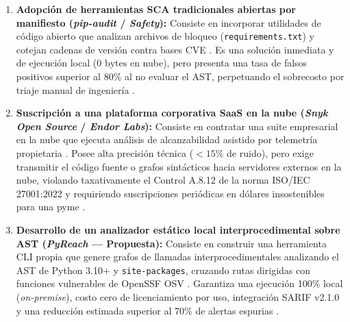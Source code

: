 \begin{enumerate}[leftmargin=1.27cm, label=\textbf{Alternativa \Alph*:}]
    \item \textbf{Adopción de herramientas SCA tradicionales abiertas por manifiesto (\textit{pip-audit} / \textit{Safety}):}
    Consiste en incorporar utilidades de código abierto que analizan archivos de bloqueo (\texttt{requirements.txt}) y cotejan cadenas de versión contra bases CVE \parencite{vargas2022analisis}. Es una solución inmediata y de ejecución local ($0\text{ bytes}$ en nube), pero presenta una tasa de falsos positivos superior al 80\% al no evaluar el AST, perpetuando el sobrecosto por triaje manual de ingeniería \parencite{pashchenko2022vuln4real, sadowski2018lessons}. %

    \item \textbf{Suscripción a una plataforma corporativa SaaS en la nube (\textit{Snyk Open Source} / \textit{Endor Labs}):}
    Consiste en contratar una suite empresarial en la nube que ejecuta análisis de alcanzabilidad asistido por telemetría propietaria \parencite{endorlabs2023state}. Posee alta precisión técnica ($<15\%$ de ruido), pero exige transmitir el código fuente o grafos sintácticos hacia servidores externos en la nube, violando taxativamente el Control A.8.12 de la norma ISO/IEC 27001:2022 y requiriendo suscripciones periódicas en dólares insostenibles para una pyme \parencite{ladisa2023sok, gutierrez2024auditoria}. %

    \item \textbf{Desarrollo de un analizador estático local interprocedimental sobre AST (\textit{PyReach} --- Propuesta):}
    Consiste en construir una herramienta CLI propia que genere grafos de llamadas interprocedimentales analizando el AST de Python 3.10+ y \texttt{site-packages}, cruzando rutas dirigidas con funciones vulnerables de OpenSSF OSV \parencite{salis2021pycg, openssf2023osv}. Garantiza una ejecución 100\% local (\textit{on-premise}), costo cero de licenciamiento por uso, integración SARIF v2.1.0 y una reducción estimada superior al 70\% de alertas espurias \parencite{oasis2019sarif, pashchenko2022vuln4real}. %
\end{enumerate}


